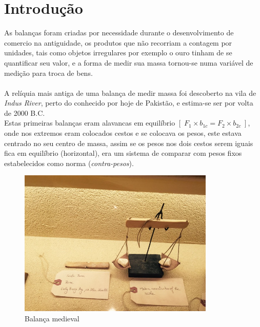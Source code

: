 \chapter{Introdução}
As balanças foram criadas por necessidade durante o desenvolvimento de comercio na antiguidade, os produtos que não recorriam a contagem por unidades, tais como objetos irregulares por exemplo o ouro tinham de se quantificar seu valor, e a forma de medir sua massa tornou-se numa variável de medição para troca de bens.\\
\\
A relíquia mais antiga de uma balança de medir massa foi descoberto na vila de \textit{Indus River}, perto do conhecido por hoje de Pakistão, e estima-se ser por volta de 2000 B.C.\\
Estas primeiras balanças eram alavancas em equilíbrio $[ \; F_{1} \times b_{1c} = F_{2} \times b_{2c} \; ]$, onde nos extremos eram colocados cestos e se colocava os pesos, este estava centrado no seu centro de massa, assim se os pesos nos dois cestos serem iguais fica em equilíbrio (horizontal), era um sistema de comparar com pesos fixos estabelecidos como norma (\textit{contra-pesos}).
\\
\begin{minipage}[!b]{0.45\linewidth}
	\begin{figure}[H]
		\centering
		\includegraphics[height=7cm]{./image/PESTA/general/balanca_1.jpg}
		\caption{Balança medieval}
		\label{balanca_1}
	\end{figure}
\end{minipage}
\hspace{2.2cm}
